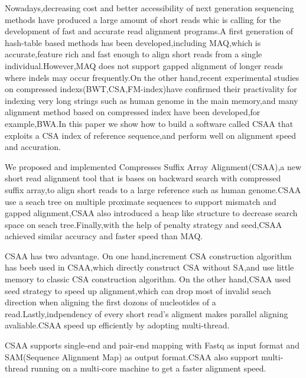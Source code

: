 \begin{englishabstract}

\setlength\parindent{0em}

\vspace{2ex}
Nowadays,decreasing cost and better accessibility of next generation sequencing methods
have produced a large amount of short reads whic is calling for the development of fast
and accurate read alignment programs.A first generation of hash-table based methods has
been developed,including MAQ,which is accurate,feature rich and fast enough to align short
reads from a single individual.However,MAQ does not support gapped alignment of longer reads
where indels may occur frequently.On the other hand,recent experimental studies on compressed
indexs(BWT,CSA,FM-index)have confirmed their practivality for indexing very long strings such
as human genome in the main memory,and many alignment method based on compressed index have
been developed,for example,BWA.In this paper we show how to build a software called CSAA that
exploits a CSA index of reference sequence,and perform well on alignment speed and accuration.

\vspace{2ex}
We proposed and implemented Compresses Suffix Array Alignment(CSAA),a new short read alignment
tool that is bases on backward search with compressed suffix array,to align short reads to a
large reference such as human genome.CSAA use a seach tree on multiple proximate sequences to
support mismatch and gapped alignment,CSAA also introduced a heap like structure to decrease
search space on seach tree.Finally,with the help of penalty strategy and seed,CSAA achieved
similar accuracy and faster speed than MAQ.


\vspace{2ex}
CSAA has two advantage. On one hand,increment CSA construction algorithm has beeb used in
CSAA,which directly construct CSA without SA,and use little memory to classic CSA construction algorithm.
On the other hand,CSAA used seed strategy to speed up alignment,which can drop most of invalid
seach direction when aligning the first dozons of nucleotides of a read.Lastly,indpendency of
every short read's aligment makes parallel aligning avaliable.CSAA speed up efficiently by
adopting multi-thread.

\vspace{2ex}
CSAA supports single-end and pair-end mapping with Fastq as input format and SAM(Sequence Alignment Map)
as output format.CSAA also support multi-thread running on a multi-core machine to get a faster
alignment speed.



\end{englishabstract}

